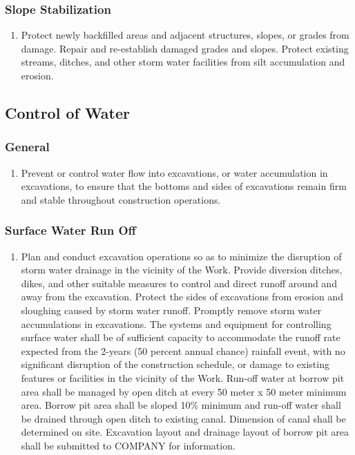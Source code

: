 \documentclass{article}%
\begin{document}
%
\subsubsection{Slope Stabilization}%
\label{ssubsec:SlopeStabilization}%
\begin{enumerate}[label=\alph*),start=1]%
\item%
Protect newly backfilled areas and adjacent structures, slopes, or grades from damage. Repair and re{-}establish damaged grades and slopes. Protect existing streams, ditches, and other storm water facilities from silt accumulation and erosion.%
\end{enumerate}

%
\subsection{Control of Water}%
\label{subsec:ControlofWater}%
\subsubsection{General}%
\label{ssubsec:General}%
\begin{enumerate}[label=\alph*),start=1]%
\item%
Prevent or control water flow into excavations, or water accumulation in excavations, to ensure that the bottoms and sides of excavations remain firm and stable throughout construction operations.%
\end{enumerate}

%
\subsubsection{Surface Water Run Off}%
\label{ssubsec:SurfaceWaterRunOff}%
\begin{enumerate}[label=\alph*),start=1]%
\item%
Plan and conduct excavation operations so as to minimize the disruption of storm water drainage in the vicinity of the Work. Provide diversion ditches, dikes, and other suitable measures to control and direct runoff around and away from the excavation. Protect the sides of excavations from erosion and sloughing caused by storm water runoff. Promptly remove storm water accumulations in excavations. The systems and equipment for controlling surface water shall be of sufficient capacity to accommodate the runoff rate expected from the 2{-}years (50 percent annual chance) rainfall event, with no significant disruption of the construction schedule, or damage to existing features or facilities in the vicinity of the Work. Run{-}off water at borrow pit area shall be managed by open ditch at every 50 meter x 50 meter minimum area. Borrow pit area shall be sloped 10\% minimum and run{-}off water shall be drained through open ditch to existing canal. Dimension of canal shall be determined on site. Excavation layout and drainage layout of borrow pit area shall be submitted to COMPANY for information.%
\end{enumerate}
\end{document}

